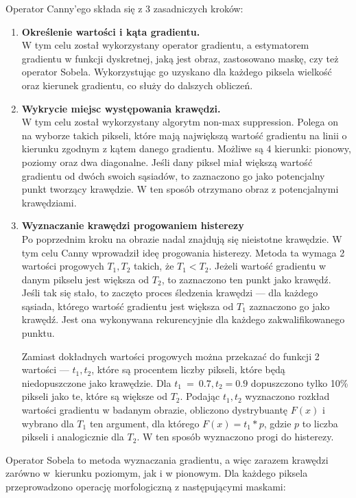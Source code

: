 \documentclass[a4paper,11pt,twoside,openright]{report}
\theoremstyle{definition}
\begin{document}
Operator Canny'ego \cite{Canny} składa się z 3 zasadniczych kroków:
\begin{enumerate}%
\item \textbf {Określenie wartości i kąta gradientu.} \\
W tym celu został wykorzystany operator gradientu, a estymatorem gradientu w funkcji dyskretnej, jaką jest obraz, zastosowano maskę, czy też operator Sobela. Wykorzystując go uzyskano dla każdego piksela wielkość oraz kierunek gradientu, co służy do dalszych obliczeń.
\item \textbf {Wykrycie miejsc występowania krawędzi.} \\
W tym celu został wykorzystany algorytm non-max suppression. Polega on na wyborze takich pikseli, które mają największą wartość gradientu na linii o kierunku zgodnym z kątem danego gradientu. Możliwe są 4 kierunki: pionowy, poziomy oraz dwa diagonalne. Jeśli dany piksel miał większą wartość gradientu od dwóch swoich sąsiadów, to zaznaczono go jako potencjalny punkt tworzący krawędzie. W ten sposób otrzymano obraz z potencjalnymi krawędziami.
\item \textbf {Wyznaczanie krawędzi progowaniem histerezy} \\
Po poprzednim kroku na obrazie nadal znajdują się nieistotne krawędzie. W tym celu Canny wprowadził ideę progowania histerezy. Metoda ta wymaga 2 wartości progowych $T_1, T_2$ takich, że $T_1 < T_2$. Jeżeli wartość gradientu w danym pikselu jest większa od $T_2$, to zaznaczono ten punkt jako krawędź. Jeśli tak się stało, to zaczęto proces śledzenia krawędzi --- dla każdego sąsiada, którego wartość gradientu jest większa od $T_1$ zaznaczono go jako krawędź. Jest ona wykonywana rekurencyjnie dla każdego zakwalifikowanego punktu.

Zamiast dokładnych wartości progowych można przekazać do funkcji 2 wartości --- $t_1, t_2$, które są procentem liczby pikseli, które będą niedopuszczone jako krawędzie. Dla $t_1~=~0.7, t_2 = 0.9$ dopuszczono tylko 10\% pikseli jako te, które są większe od $T_2$. Podając $t_1, t_2$ wyznaczono rozkład wartości gradientu w badanym obrazie, obliczono dystrybuantę $F(x)$ i wybrano dla $T_1$ ten argument, dla którego $F(x) = t_1 * p$, gdzie $p$ to liczba pikseli i analogicznie dla $T_2$. W ten sposób wyznaczono progi do histerezy.

\end{enumerate}

Operator Sobela \cite{Sobel} to metoda wyznaczania gradientu, a więc zarazem krawędzi zarówno w~kierunku poziomym, jak i w pionowym. Dla każdego piksela przeprowadzono operację morfologiczną z następującymi maskami:
\end{document}
